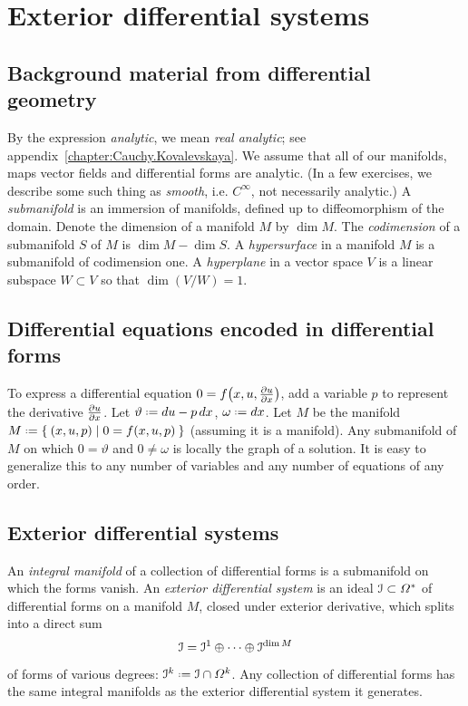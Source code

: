 \chapter{Exterior differential systems}\label{chapter:eds}

\section{Background material from differential geometry}
By the expression \emph{analytic}, we mean \emph{real analytic}; see appendix~\ref{chapter:Cauchy.Kovalevskaya}.
We assume that all of our manifolds, maps vector fields and differential forms are analytic.
(In a few exercises, we describe some such thing as \emph{smooth}, i.e. \(C^{\infty}\), not necessarily analytic.)
A \emph{submanifold} is an immersion of manifolds, defined up to diffeomorphism of the domain.
Denote the dimension of a manifold \(M\) by \(\dim M\).
The \emph{codimension} of a submanifold \(S\) of \(M\) is \(\dim M - \dim S\).
A \emph{hypersurface} in a manifold \(M\) is a submanifold of codimension one.
A \emph{hyperplane} in a vector space \(V\) is a linear subspace \(W\subset V\) so that \(\dim (V/W)=1\).


\section{Differential equations encoded in differential forms}
To express a differential equation \(0=f\of{x,u,\pderiv{u}{x}}\), add a variable \(p\) to represent the derivative \(\pderiv{u}{x}\).
Let \(\vartheta\defeq du-p \, dx\), \(\omega\defeq dx\). Let \(M\) be the manifold \(M\defeq\Set{(x,u,p)|0=f\of{x,u,p}}\) (assuming it is a manifold).
Any submanifold of \(M\) on which \(0=\vartheta\) and \(0\ne \omega\) is locally the graph of a solution.
It is easy to generalize this to any number of variables and any number of equations of any order.

\section{Exterior differential systems}
An \emph{integral manifold} of a collection of differential forms is a submanifold on which the forms vanish.
An \emph{exterior differential system} is an ideal \(\mathcal{I} \subset \Omega^*\) of differential forms on a manifold \(M\), closed under exterior derivative, which splits into a direct sum
\[
\mathcal{I}=\mathcal{I}^1 \oplus \dots \oplus \mathcal{I}^{\dim M}
\]
of forms of various degrees: \(\II^k \defeq \II \cap \Omega^k\).
Any collection of differential forms has the same integral manifolds as the exterior differential system it generates.

